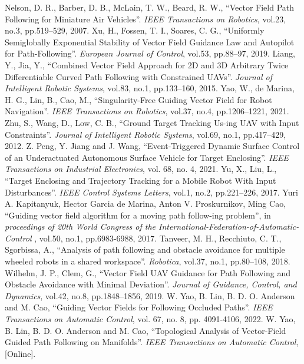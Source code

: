 \documentclass[a4paper, 10pt, conference]{ieeeconf}      %
\begin{document}
\begin{thebibliography}{99}
 Nelson, D. R., Barber, D. B., McLain, T. W., Beard, R. W., “Vector Field Path Following for Miniature Air Vehicles”. \emph{IEEE Transactions on Robotics}, vol.23, no.3, pp.519--529, 2007.
 Xu, H., Fossen, T. I., Soares, C. G., “Uniformly Semiglobally Exponential Stability of Vector Field Guidance Law and Autopilot for Path-Following”. \emph{European Journal of Control}, vol.53, pp.88--97, 2019.
 Liang, Y., Jia, Y., “Combined Vector Field Approach for 2D and 3D Arbitrary Twice Differentiable Curved Path Following with Constrained UAVs”. \emph{Journal of Intelligent Robotic Systems}, vol.83, no.1, pp.133--160, 2015.
 Yao, W., de Marina, H. G., Lin, B., Cao, M., “Singularity-Free Guiding Vector Field for Robot Navigation”. \emph{IEEE Transactions on Robotics}, vol.37, no.4, pp.1206--1221, 2021.
 Zhu, S., Wang, D., Low, C. B., “Ground Target Tracking Us-ing UAV with Input Constraints”. \emph{Journal of Intelligent Robotic Systems}, vol.69, no.1, pp.417--429, 2012.
 Z. Peng, Y. Jiang and J. Wang, “Event-Triggered Dynamic Surface Control of an Underactuated Autonomous Surface Vehicle for Target Enclosing”. \emph{IEEE Transactions on Industrial Electronics}, vol. 68, no. 4, 2021.
	Yu, X., Liu, L., “Target Enclosing and Trajectory Tracking for a Mobile Robot With Input Disturbances”. \emph{IEEE Control Systems Letters}, vol.1, no.2, pp.221--226, 2017.
 Yuri A. Kapitanyuk, Hector Garcia de Marina, Anton V. Proskurnikov, Ming Cao, “Guiding vector field algorithm for a moving path follow-ing problem”, in \emph{proceedings of 20th World Congress of the International-Federation-of-Automatic-Control }, vol.50, no.1, pp.6983-6988, 2017.
 Tanveer, M. H., Recchiuto, C. T., Sgorbissa, A., “Analysis of path following and obstacle avoidance for multiple wheeled robots in a shared workspace”. \emph{Robotica}, vol.37, no.1,  pp.80--108, 2018.
 Wilhelm, J. P., Clem, G., “Vector Field UAV Guidance for Path Following and Obstacle Avoidance with Minimal Deviation”. \emph{Journal of Guidance, Control, and Dynamics}, vol.42, no.8, pp.1848--1856, 2019. 
 W. Yao, B. Lin, B. D. O. Anderson and M. Cao, “Guiding Vector Fields for Following Occluded Paths”. \emph{IEEE Transactions on Automatic Control}, vol. 67, no. 8, pp. 4091-4106, 2022.
 W. Yao, B. Lin, B. D. O. Anderson and M. Cao, “Topological Analysis of Vector-Field Guided Path Following on Manifolds”. \emph{IEEE Transactions on Automatic Control}, [Online]. 






\end{thebibliography}
\end{document}
